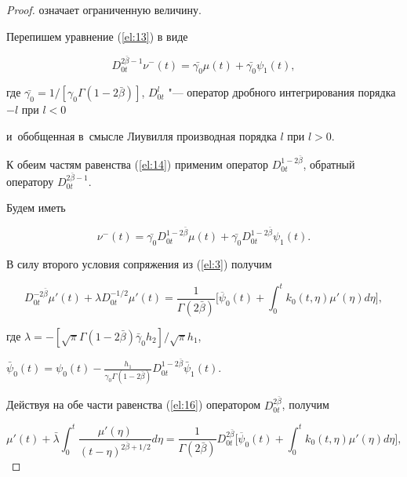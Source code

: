 \begin{proof}
означает ограниченную величину.

Перепишем уравнение (\ref{el:13}) в виде

\begin{equation} \label{el:14}

D_{0t}^{2\bar{\beta}-1}\nu^-(t)=\bar{\gamma_0}\mu(t)+\bar{\gamma_0}\psi_1(t),

\end{equation}

где $\bar{\gamma_0}=1/[\gamma_0\Gamma(1-2\bar{\beta})]$, $D_{0t}^l$ "--- оператор дробного интегрирования порядка ${-l}$ при $l<0$

и~обобщенная в~смысле Лиувилля производная порядка $l$ при $l>0$.



К обеим частям равенства (\ref{el:14}) применим оператор $D_{0t}^{1-2\bar{\beta}}$, обратный оператору $D_{0t}^{2\bar{\beta}-1}$.

Будем иметь

\begin{equation} \label{el:15}

\nu^-(t)=\bar{\gamma_0}D_{0t}^{1-2\bar{\beta}}\mu(t)+\bar{\gamma_0}D_{0t}^{1-2\bar{\beta}}\psi_1(t).

\end{equation}



В силу второго условия сопряжения из (\ref{el:3}) получим

\begin{equation} \label{el:16}

D_{0t}^{-2\bar{\beta}}\mu'(t)+\lambda D_{0t}^{-1/2}\mu'(t)=\frac{1}{\Gamma(2\bar{\beta})}\biggl[\overline{\psi}_0(t)+\int_0^tk_0(t,\eta)\mu'(\eta)d\eta\biggr],

\end{equation}

где $\lambda=-[\sqrt{\pi}\Gamma(1-2\bar{\beta})\bar{\gamma}_0h_2]/\sqrt{\pi}h_1$,

$\bar{\psi}_0(t)=\psi_0(t)-\frac{h_1}{\gamma_0\Gamma(1-2\bar{\beta})}D_{0t}^{1-2\bar{\beta}}\bar{\psi}_1(t)$.



Действуя на обе части равенства (\ref{el:16}) оператором $D_{0t}^{2\bar{\beta}}$, получим

\begin{equation} \label{el:17}

\mu'(t)+\bar{\lambda}\int_0^t\frac{\mu'(\eta)}{(t-\eta)^{2\bar{\beta}+1/2}}d\eta=\frac{1}{\Gamma(2\bar{\beta})}D_{0t}^{2\bar{\beta}}\biggl[\overline{\psi}_0(t)+\int_0^tk_0(t,\eta)\mu'(\eta)d\eta\biggr],


\end{equation}
\end{proof}
